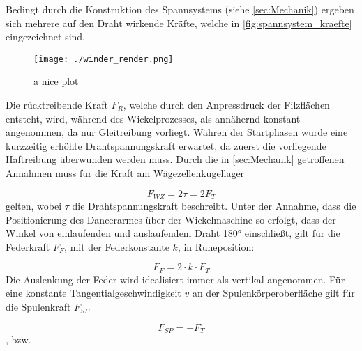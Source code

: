 Bedingt durch die Konstruktion des Spannsystems (siehe \autoref{sec:Mechanik}) ergeben sich mehrere auf den Draht wirkende Kräfte, welche in \autoref{fig:spannsystem_kraefte} eingezeichnet sind.
\begin{figure}[H]
    \centering
    \texttt{[image: ./winder\_render.png]}
    \caption{a nice plot}
    \label{fig:spannsystem_kraefte}
\end{figure}
Die rücktreibende Kraft $F_R$, welche durch den Anpressdruck der Filzflächen entsteht, wird, während des Wickelprozesses, als annähernd konstant angenommen, da nur Gleitreibung vorliegt. Währen der Startphasen wurde eine kurzzeitig erhöhte Drahtspannungskraft erwartet, da zuerst die vorliegende Haftreibung überwunden werden muss. Durch die in \autoref{sec:Mechanik} getroffenen Annahmen muss für die Kraft am Wägezellenkugellager

\begin{equation}
    \label{eq:wz_kraft}
    F_{WZ} = 2  \tau = 2  F_T
\end{equation}
gelten, wobei $\tau$ die Drahtspannungskraft beschreibt. Unter der Annahme, dass die Positionierung des Dancerarmes über der Wickelmaschine so erfolgt, dass der Winkel von einlaufenden und auslaufendem Draht 180° einschließt, gilt für die Federkraft $F_F$, mit der Federkonstante $k$, in Ruheposition:

\begin{equation}
    F_F = 2 \cdot k  \cdot F_T
\end{equation}
Die Auslenkung der Feder wird idealisiert immer als vertikal angenommen. Für eine konstante Tangentialgeschwindigkeit $v$ an der Spulenkörperoberfläche gilt für die Spulenkraft $F_{SP}$

\begin{equation}
    F_{SP} = -F_T
\end{equation}
, bzw.

